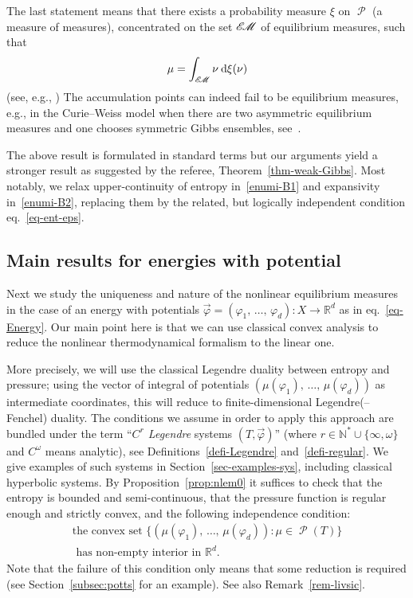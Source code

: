 \documentclass[AHL, Unicode, longabstracts,published]{cedram}
\theoremstyle{plain}
\theoremstyle{plain}
\newcommand\Prob{{\operatorname{\mathscr{P}}}}
\newcommand*{\dd} {\relax\ifnum\lastnodetype>0\mskip\medmuskip\fi\mathrm{d}}
\newcommand{\EM}{\mathscr{E\kern-2pt M}}
\newcommand{\pot}{\varphi}
\newcommand*\8{\infty}
\newcommand\NN{\mathbb{N}}
\newcommand\RR{\mathbb{R}}
\begin{document}

The last statement means that there exists a probability measure $\xi$ on $\Prob$ (a measure of measures), concentrated on the set $\EM$ of equilibrium measures, such that
\[
\mu = \int_{\EM} \nu \dd\xi(\nu)
\]
(see, e.g., \cite[Proposition~1.2]{Phelps-book}) The accumulation points can indeed fail to be equilibrium measures, e.g., in the Curie--Weiss model when there are two asymmetric equilibrium measures and one chooses symmetric Gibbs ensembles, see~\cite{Leplaideur-Watbled}.

\begin{rema}\label{rem-exist-theo}
The above result is formulated in standard terms but our arguments yield a stronger result as suggested by the referee, Theorem~\ref{thm-weak-Gibbs}. Most notably, we relax upper-continuity of entropy in~\eqref{enumi-B1} and expansivity in~\eqref{enumi-B2}, replacing them by the related, but logically independent condition eq.~\eqref{eq-ent-eps}.
\end{rema}



\subsection{Main results for energies with potential}\label{subsec-energy}

Next we study the uniqueness and nature of the nonlinear equilibrium measures in the case of an energy with potentials $\vec\pot=(\pot_1,\,\dots,\,\pot_d):X\to\RR^d$ as in eq.~\eqref{eq-Energy}. Our main point here is that we can use classical convex analysis to reduce the nonlinear thermodynamical formalism to the linear one.

More precisely, we will use the classical Legendre duality between entropy and pressure; using the vector of integral of potentials $(\mu(\pot_1),\,\dots,\,\mu(\pot_d))$ as intermediate coordinates, this will reduce to finite-dimensional Legendre(--Fenchel) duality. The conditions we assume in order to apply this approach are bundled under the term ``\emph{$C^r$ Legendre} systems $(T,\vec\pot)$'' (where $r\in\NN^*\cup\{\infty,\omega\}$ and $C^\omega$ means analytic), see Definitions~\ref{defi-Legendre} and~\ref{defi-regular}. We give examples of such systems in Section~\ref{sec-examples-sys}, including classical hyperbolic systems. By Proposition~\ref{prop:nlem0} it suffices to check that the entropy is bounded and semi-continuous, that the pressure function is regular enough and strictly convex, and the following independence condition:
\begin{multline}\label{eq-independence}
\text{the convex set }\{(\mu(\pot_1),\,\dots,\,\mu(\pot_d)):\mu\in\Prob(T)\} \\
\text{ has non-empty interior in }\RR^d.
\end{multline}
Note that the failure of this condition only means that some reduction is required (see Section~\ref{subsec:potts} for an example). See also Remark~\ref{rem-livsic}.
\end{document}
